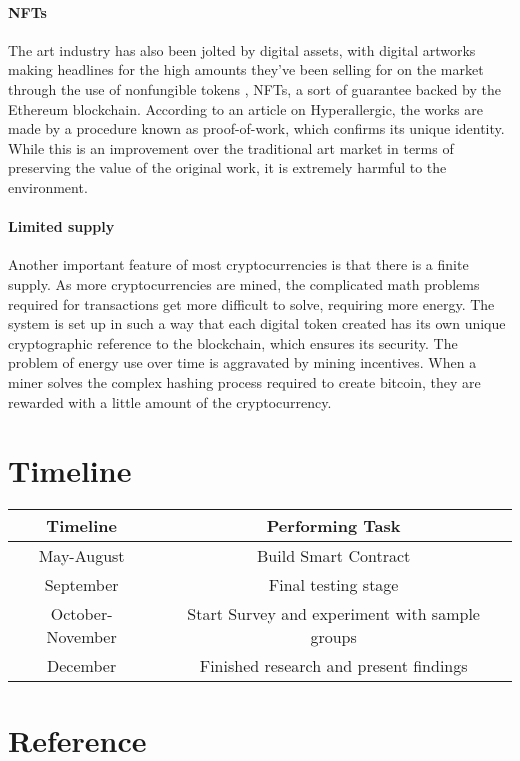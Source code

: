 \documentclass[10pt,twocolumn]{article}
\begin{document}
\paragraph{NFTs}

The art industry has also been jolted by digital assets, with digital artworks making headlines for the high amounts they've been selling for on the market through the use of nonfungible tokens , NFTs, a sort of guarantee backed by the Ethereum blockchain. According to an article on Hyperallergic, the works are made by a procedure known as proof-of-work, which confirms its unique identity. While this is an improvement over the traditional art market in terms of preserving the value of the original work, it is extremely harmful to the environment.

\paragraph{Limited supply}

Another important feature of most cryptocurrencies is that there is a finite supply. As more cryptocurrencies are mined, the complicated math problems required for transactions get more difficult to solve, requiring more energy.\cite{Bariviera} The system is set up in such a way that each digital token created has its own unique cryptographic reference to the blockchain, which ensures its security. The problem of energy use over time is aggravated by mining incentives. When a miner solves the complex hashing process required to create bitcoin, they are rewarded with a little amount of the cryptocurrency.


\section{Timeline}

    \begin{tabular} { | c | c | }
    \hline
     Timeline & Performing Task \\
    \hline
    May-August & Build Smart Contract\\
    \hline
    September & Final testing stage\\
    \hline
    October-November & Start Survey and experiment with sample groups\\
    \hline
    December & Finished research and present findings\\
    \hline
    \end{tabular}

\section{Reference}
 

\end{document}
